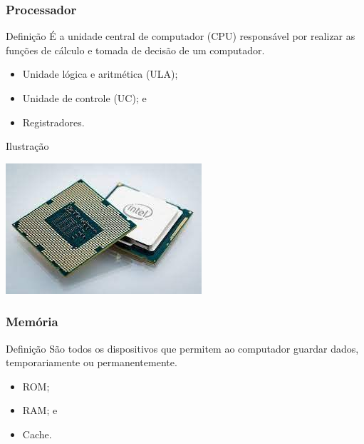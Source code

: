 \documentclass[aspectratio=169]{beamer} %
\begin{document}
\begin{frame}
	\frametitle{Processador}
	
	\begin{block}{Defini\c cão}
		É a unidade central de computador (CPU) responsável por realizar as funções de cálculo e tomada de decisão de um computador.
	\end{block}\vfill
	
	\begin{itemize}
		\item Unidade lógica e aritmética (ULA);
		\item Unidade de controle (UC); e
		\item Registradores.
	\end{itemize}\vfill
	
	\begin{exampleblock}{Ilustra\c cão}
		\begin{center}
			\includegraphics[scale=0.4]{img/processador}
		\end{center}
	\end{exampleblock}
\end{frame}

\begin{frame}
	\frametitle{Memória}
	
	\begin{block}{Defini\c cão}
		São todos os dispositivos que permitem ao computador guardar dados, temporariamente ou permanentemente.
	\end{block}\vfill
	
	\begin{itemize}
		\item ROM;
		\item RAM; e 
		\item Cache.
	\end{itemize}
\end{frame}
\end{document}
